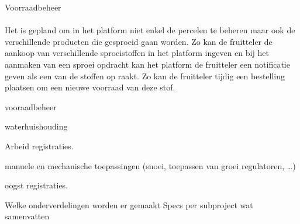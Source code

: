 Voorraadbeheer

\paragraph {} Het is gepland om in het platform niet enkel de percelen te beheren maar ook de
verschillende producten die gesproeid gaan worden. Zo kan de fruitteler de aankoop van
verschillende sproeistoffen in het platform ingeven en bij het aanmaken van een sproei
opdracht kan het platform de fruitteler een notificatie geven als een van de stoffen op raakt.
Zo kan de fruitteler tijdig een bestelling plaatsen om een nieuwe voorraad van deze stof.

vooraadbeheer

waterhuishouding

Arbeid registraties.

manuele en mechanische toepassingen (snoei,  toepassen van groei regulatoren, …)

oogst registraties.


Welke onderverdelingen worden er gemaakt
Specs per subproject wat samenvatten


